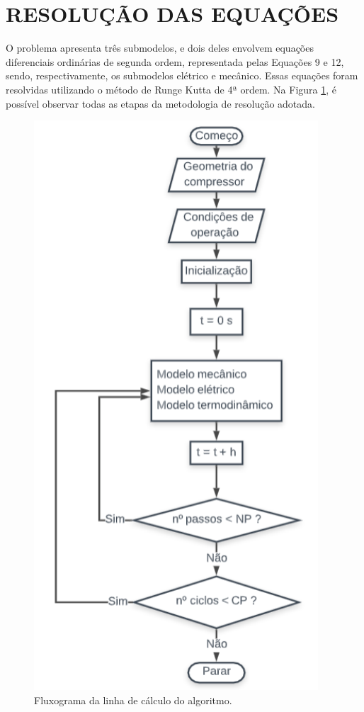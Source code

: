 \section{RESOLUÇÃO DAS EQUAÇÕES}

O problema apresenta três submodelos, e dois deles envolvem equações diferenciais ordinárias de segunda ordem, representada pelas Equações 9 e 12, sendo, respectivamente, os submodelos elétrico e mecânico. Essas equações foram resolvidas utilizando o método de Runge Kutta de 4ª ordem.
Na Figura \ref{fig:fluxograma}, é possível observar todas as etapas da metodologia de resolução adotada. 

\begin{figure}[htb]
	\caption{\label{fig:fluxograma}Fluxograma da linha de cálculo do algoritmo.}
	\begin{center}
		\includegraphics[scale=0.65]{images/modelo_geral.png}
	\end{center}
\end{figure}


